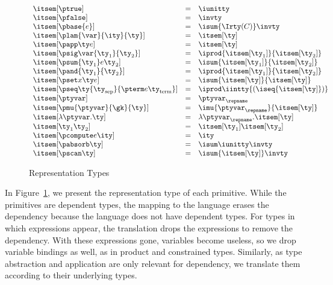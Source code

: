 \begin{figure}
\fbox{$\itsem[\ty] = \ity$}
\[
\begin{array}{lcl} 
\itsem[\ptrue] & = & \iunitty \\
\itsem[\pfalse] & = & \invty \\
\itsem[\pbase{e}] & = & \isum {\Irty(C)} \invty   \\
\itsem[\plam{\var}{\ity}{\ty}] & = & \itsem[\ty] \\
\itsem[\papp \ty e] & = & \itsem[\ty] \\
\itsem[\psig \var {\ty_1} {\ty_2}]  & = & \iprod {\itsem[\ty_1]} {\itsem[\ty_2]}    \\
\itsem[\psum {\ty_1} e {\ty_2}]     & = & \isum {\itsem[\ty_1]} {\itsem[\ty_2]} \\
\itsem[\pand {\ty_1} {\ty_2}]  & = & \iprod {\itsem[\ty_1]}{\itsem[\ty_2]}\\
\itsem[\pset x \ty e] & = & \isum {\itsem[\ty]}{\itsem[\ty]}\\
\itsem[\pseq \ty {\ty_{\text{sep}}} {\pterm e {\ty_{\text{term}}}}] & = & 
    \iprod \iintty {(\iseq{\itsem[\ty]})}             \\
\itsem[\ptyvar] & = & \ptyvar_\repname \\
\itsem[\pmu{\ptyvar}{\gk}{\ty}] & = & \imu{\ptyvar_\repname}{\itsem[\ty]} \\
\itsem[\lambda \ptyvar.\ty]       & = & \lambda \ptyvar_\repname.\itsem[\ty] \\
\itsem[\ty_1 \ty_2]              & = & \itsem[\ty_1] \itsem[\ty_2] \\
\itsem[\pcompute e \ity]                 & = & \ity \\
\itsem[\pabsorb \ty]                     & = & \isum \iunitty \invty \\
\itsem[\pscan \ty] & = & \isum {\itsem[\ty]} \invty
\end{array}
\]
\caption{Representation Types}
\label{fig:rep-tys}
\end{figure}

In Figure~\ref{fig:rep-tys}, we present the representation type
of each \ddc{} primitive. While the primitives are
dependent types, the mapping to the \implang{} language erases the dependency because the \implang{} language does not have dependent types. For \ddc{} types in which expressions appear,
the translation drops the expressions to remove the dependency.
With these expressions gone, variables become useless, so we drop 
variable bindings as well, as in product and constrained types.
Similarly, as type abstraction and application are only relevant for
dependency, we translate them according to their underlying types.

